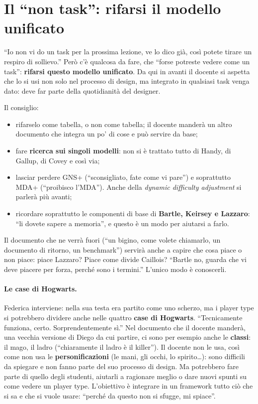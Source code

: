 \section{Il ``non task'': rifarsi il modello unificato}
\label{gd18:sec:rifare}

``Io non vi do un task per la prossima lezione, ve lo dico già, così potete tirare un
respiro di sollievo.'' Però c'è qualcosa da fare, che ``forse potreste vedere come un
task'': \textbf{rifarsi questo modello unificato}. Da qui in avanti il docente si
aspetta che lo si usi non solo nel processo di design, ma integrato in qualsiasi task
venga dato: deve far parte della quotidianità del designer.

Il consiglio:
\begin{itemize}
  \item rifarselo come tabella, o non come tabella; il docente manderà un altro
        documento che integra un po' di cose e può servire da base;
  \item fare \textbf{ricerca sui singoli modelli}: non si è trattato tutto di Handy,
        di Gallup, di Covey e così via;
  \item lasciar perdere GNS+ (``sconsigliato, fate come vi pare'') e soprattutto MDA+
        (``proibisco l'MDA''). Anche della \emph{dynamic difficulty adjustment} si
        parlerà più avanti;
  \item ricordare soprattutto le componenti di base di \textbf{Bartle, Keirsey e
        Lazzaro}: ``li dovete sapere a memoria'', e questo è un modo per aiutarsi a
        farlo.
\end{itemize}
Il documento che ne verrà fuori (``un bigino, come volete chiamarlo, un documento di
ritorno, un benchmark'') servirà anche a capire che cosa piace o non piace: piace
Lazzaro? Piace come divide Caillois? ``Bartle no, guarda che vi deve piacere per
forza, perché sono i termini.'' L'unico modo è conoscerli.

\paragraph{Le case di Hogwarts.} Federica interviene: nella sua testa era partito
come uno scherzo, ma i player type si potrebbero dividere anche nelle quattro
\textbf{case di Hogwarts}. ``Tecnicamente funziona, certo. Sorprendentemente sì.''
Nel documento che il docente manderà, una vecchia versione di Diego da cui partire,
ci sono per esempio anche le \textbf{classi}: il mago, il ladro (``chiaramente il
ladro è il killer''). Il docente non le usa, così come non usa le
\textbf{personificazioni} (le mani, gli occhi, lo spirito\dots): sono difficili da
spiegare e non fanno parte del suo processo di design. Ma potrebbero fare parte di
quello degli studenti, aiutarli a ragionare meglio o dare nuovi spunti su come
vedere un player type. L'obiettivo è integrare in un framework tutto ciò che si sa e
che si vuole usare: ``perché da questo non si sfugge, mi spiace''.


